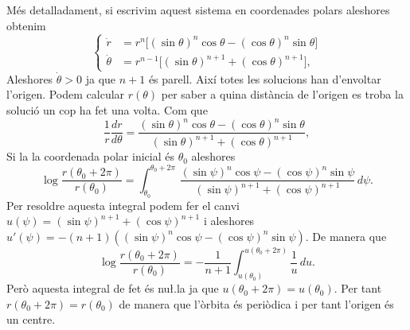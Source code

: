 \documentclass[12pt]{article}
\begin{document}
\begin{enumerate}[label=(\roman*), font=\bfseries \sffamily, wide, labelwidth=!, labelindent=0pt]
		Més detalladament, si escrivim aquest sistema en coordenades polars aleshores obtenim 
		\begin{equation*}
			\left\{ 
				\begin{aligned}
					\dot{r} & = r^n \big[(\sin{\theta})^n \cos{\theta} - (\cos{\theta})^n \sin{\theta}\big] \\
					\dot{\theta} & = r^{n-1}\big[(\sin{\theta})^{n+1}  + (\cos{\theta})^{n+1} \big],
				\end{aligned} 
			\right. 
		\end{equation*}
		Aleshores \( \dot{\theta} > 0 \) ja que \( n+1 \) és parell. Així totes les solucions han d'envoltar l'origen. Podem calcular \( r(\theta) \) per saber a quina distància de l'origen es troba la solució un cop ha fet una volta. Com que
		\begin{equation*}
		\frac{1}{r}\frac{dr}{d\theta} = \frac{(\sin{\theta})^n \cos{\theta} - (\cos{\theta})^n \sin{\theta}}{(\sin{\theta})^{n+1}  + (\cos{\theta})^{n+1} },
		\end{equation*}
	Si la la coordenada polar inicial és \( \theta_0 \) aleshores
	\begin{equation*}
		\log{\frac{r(\theta_0 + 2\pi)}{r(\theta_0)}} = \int_{\theta_0}^{\theta_0 + 2\pi} \, \frac{(\sin{\psi})^n \cos{\psi} - (\cos{\psi})^n \sin{\psi}}{(\sin{\psi})^{n+1}  + (\cos{\psi})^{n+1} } \, d \psi.
	\end{equation*}
	Per resoldre aquesta integral podem fer el canvi \( u(\psi) = (\sin{\psi})^{n+1}  + (\cos{\psi})^{n+1} \)	i aleshores \( u'(\psi) = -(n+1)\left((\sin{\psi})^n \cos{\psi} - (\cos{\psi})^n \sin{\psi}\right) \). De manera que
	\begin{equation*}
	\log{\frac{r(\theta_0 + 2\pi)}{r(\theta_0)}} = - \frac{1}{n+1} \int_{u(\theta_0)}^{u(\theta_0 + 2\pi)} \frac{1}{u} \, du. 
	\end{equation*}
	Però aquesta integral de fet és nu\l.la ja que \( u(\theta_0 + 2\pi) = u(\theta_0) \). Per tant \( r(\theta_0 + 2\pi) = r(\theta_0) \) de manera que l'òrbita és periòdica i per tant l'origen és un centre. 	
	


\end{enumerate}
\end{document}
